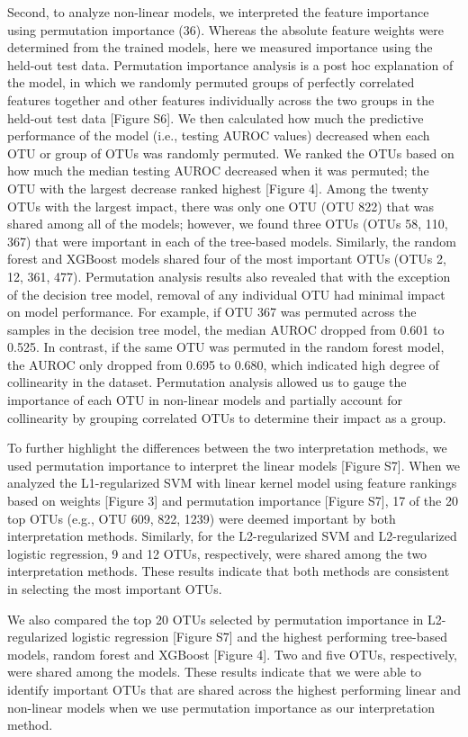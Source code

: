 \documentclass[11pt,]{article}
\begin{document}
Second, to analyze non-linear models, we interpreted the feature
importance using permutation importance (36). Whereas the absolute
feature weights were determined from the trained models, here we
measured importance using the held-out test data. Permutation importance
analysis is a post hoc explanation of the model, in which we randomly
permuted groups of perfectly correlated features together and other
features individually across the two groups in the held-out test data
{[}Figure S6{]}. We then calculated how much the predictive performance
of the model (i.e., testing AUROC values) decreased when each OTU or
group of OTUs was randomly permuted. We ranked the OTUs based on how
much the median testing AUROC decreased when it was permuted; the OTU
with the largest decrease ranked highest {[}Figure 4{]}. Among the
twenty OTUs with the largest impact, there was only one OTU (OTU 822)
that was shared among all of the models; however, we found three OTUs
(OTUs 58, 110, 367) that were important in each of the tree-based
models. Similarly, the random forest and XGBoost models shared four of
the most important OTUs (OTUs 2, 12, 361, 477). Permutation analysis
results also revealed that with the exception of the decision tree
model, removal of any individual OTU had minimal impact on model
performance. For example, if OTU 367 was permuted across the samples in
the decision tree model, the median AUROC dropped from 0.601 to 0.525.
In contrast, if the same OTU was permuted in the random forest model,
the AUROC only dropped from 0.695 to 0.680, which indicated high degree
of collinearity in the dataset. Permutation analysis allowed us to gauge
the importance of each OTU in non-linear models and partially account
for collinearity by grouping correlated OTUs to determine their impact
as a group.

To further highlight the differences between the two interpretation
methods, we used permutation importance to interpret the linear models
{[}Figure S7{]}. When we analyzed the L1-regularized SVM with linear
kernel model using feature rankings based on weights {[}Figure 3{]} and
permutation importance {[}Figure S7{]}, 17 of the 20 top OTUs (e.g., OTU
609, 822, 1239) were deemed important by both interpretation methods.
Similarly, for the L2-regularized SVM and L2-regularized logistic
regression, 9 and 12 OTUs, respectively, were shared among the two
interpretation methods. These results indicate that both methods are
consistent in selecting the most important OTUs.

We also compared the top 20 OTUs selected by permutation importance in
L2-regularized logistic regression {[}Figure S7{]} and the highest
performing tree-based models, random forest and XGBoost {[}Figure 4{]}.
Two and five OTUs, respectively, were shared among the models. These
results indicate that we were able to identify important OTUs that are
shared across the highest performing linear and non-linear models when
we use permutation importance as our interpretation method.
\end{document}
